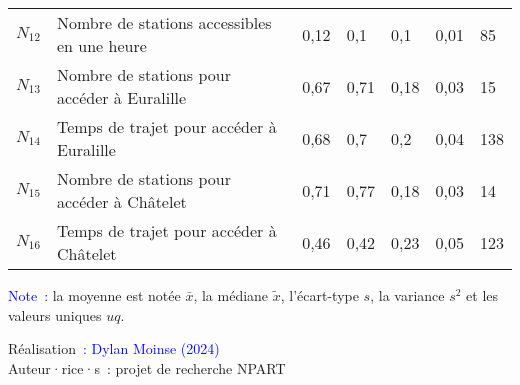 \begin{table}[h!]
{\begin{tabular}{p{}p{}p{}p{}p{}p{}p{}}
\small{\(N_{12}\)} & \small{Nombre de stations accessibles en une heure} & \small{0,12} & \small{0,1} & \small{0,1} & \small{0,01} & \small{85}\\
\small{\(N_{13}\)} & \small{Nombre de stations pour accéder à Euralille} & \small{0,67} & \small{0,71} & \small{0,18} & \small{0,03} & \small{15}\\
\small{\(N_{14}\)} & \small{Temps de trajet pour accéder à Euralille} & \small{0,68} & \small{0,7} & \small{0,2} & \small{0,04} & \small{138}\\
\small{\(N_{15}\)} & \small{Nombre de stations pour accéder à Châtelet} & \small{0,71} & \small{0,77} & \small{0,18} & \small{0,03} & \small{14}\\
\small{\(N_{16}\)} & \small{Temps de trajet pour accéder à Châtelet} & \small{0,46} & \small{0,42} & \small{0,23} & \small{0,05} & \small{123}\\
        \hline
    \end{tabular}}
    \caption*{}
    \vspace{5pt}
        \begin{flushleft}\scriptsize{
        \textcolor{blue}{Note~:} la moyenne est notée \(\bar{x}\), la médiane \(\tilde{x}\), l'écart-type \(s\), la variance \(s^2\) et les valeurs uniques \(uq\).
        }\end{flushleft}
        \begin{flushright}\scriptsize
        Réalisation~: \textcolor{blue}{Dylan Moinse (2024)}
        \\
        Auteur·rice·s~: projet de recherche \acrshort{NPART}
        \end{flushright}
        \end{table}